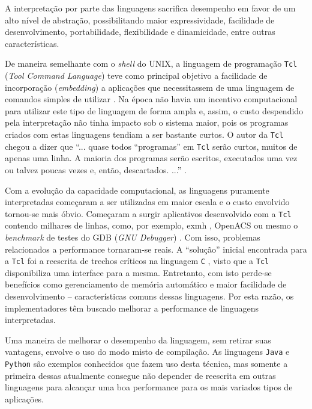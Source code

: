 A interpretação por parte das linguagens sacrifica desempenho em
favor de um alto nível de abstração, possibilitando maior
expressividade, facilidade de
desenvolvimento, portabilidade, flexibilidade e dinamicidade, entre
outras características.

De maneira semelhante com o \textit{shell} do UNIX,
a linguagem de programação \texttt{Tcl} (\textit{Tool
  Command Language}) teve como principal objetivo a
facilidade de incorporação (\textit{embedding}) a aplicações que
necessitassem de uma linguagem de comandos simples de utilizar
\cite{ousterhout_89}. Na época não havia um
incentivo computacional para utilizar este tipo de linguagem de forma
ampla e, assim, o custo despendido pela interpretação não tinha
impacto sob o sistema maior, pois os programas criados com estas linguagens
tendiam a ser bastante curtos. O autor da \texttt{Tcl} chegou a dizer
que ``... quase todos ``programas'' em \texttt{Tcl} serão curtos,
muitos de apenas uma linha. A maioria dos programas serão escritos,
executados uma vez ou talvez poucas vezes e, então,
descartados. ...'' \cite{ousterhout_89}.

Com a evolução da capacidade computacional, as linguagens
puramente interpretadas começaram a ser utilizadas em maior
escala e o custo envolvido tornou-se mais óbvio.
Começaram a surgir aplicativos desenvolvido com a
\texttt{Tcl} contendo milhares de linhas,
como, por exemplo, exmh \cite{exmh}, OpenACS \cite{openacs} ou mesmo o
\textit{benchmark} de testes do GDB (\textit{GNU Debugger})
\cite{gdb_testsuite}.
Com isso, problemas relacionados a performance tornaram-se reais.
A ``solução'' inicial
encontrada para a \texttt{Tcl} foi a
reescrita de trechos críticos na
linguagem \texttt{C} \cite{krbook}, visto que a \texttt{Tcl}
disponibiliza uma interface para a mesma. Entretanto, com isto perde-se
benefícios como gerenciamento de memória automático e maior facilidade
de desenvolvimento -- características comuns dessas linguagens.
Por esta razão, os implementadores têm
buscado melhorar a performance de linguagens interpretadas.

Uma maneira de melhorar o desempenho da linguagem, sem retirar suas
vantagens, envolve o uso do modo
misto de compilação. As linguagens \texttt{Java} \cite{javaspec} e
\texttt{Python} \cite{pythonspec} são exemplos
conhecidos que fazem uso desta técnica, mas somente a primeira dessas
atualmente consegue não depender de reescrita em outras linguagens
para alcançar uma boa performance para os mais variados tipos
de aplicações.

